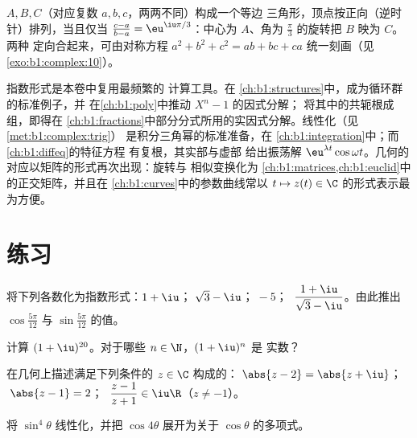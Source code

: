 \begin{example}\label{ex:b1:complex:equilateral}
$A, B, C$（对应复数 $a, b, c$，两两不同）构成一个等边
三角形，顶点按正向（逆时针）排列，当且仅当
$\frac{c - a}{b - a} = \eu^{\iu\pi/3}$：中心为
$A$、角为 $\frac\pi3$ 的旋转把 $B$ 映为 $C$。两种
定向合起来，可由对称方程 $a^2 + b^2 + c^2 = ab
+ bc + ca$ 统一刻画（见\cref{exo:b1:complex:10}）。
\end{example}

\begin{remark}[本章的应用]\label{rem:b1:complex:whereused}
指数形式是本卷中复用最频繁的
计算工具。在
\cref{ch:b1:structures}中，成为循环群的标准例子，并
在\cref{ch:b1:poly}中推动 $X^n - 1$ 的因式分解；
将其中的共轭根成组，即得在
\cref{ch:b1:fractions}中部分分式所用的实因式分解。线性化（见\cref{met:b1:complex:trig}）
是积分三角幂的标准准备，在
\cref{ch:b1:integration}中；而\cref{ch:b1:diffeq}的特征方程
有复根，其实部与虚部
给出振荡解 $\eu^{\lambda t}\cos\omega
t$。几何的对应以矩阵的形式再次出现：旋转与
相似变换化为
\cref{ch:b1:matrices,ch:b1:euclid}中的正交矩阵，并且在
\cref{ch:b1:curves}中的参数曲线常以 $t \mapsto z(t)
\in \C$ 的形式表示最为方便。
\end{remark}

\section{练习}

\begin{exercise}[$\star$]\label{exo:b1:complex:1}
将下列各数化为指数形式：$1 + \iu$；$\;\sqrt 3 - \iu$；$\;-5$；
$\;\dfrac{1 + \iu}{\sqrt 3 - \iu}$。由此推出
$\cos\frac{5\pi}{12}$ 与 $\sin\frac{5\pi}{12}$ 的值。
\end{exercise}

\begin{exercise}[$\star$]\label{exo:b1:complex:2}
计算 $(1 + \iu)^{20}$。对于哪些 $n \in \N$，$(1 + \iu)^n$ 是
实数？
\end{exercise}

\begin{exercise}[$\star$]\label{exo:b1:complex:3}
在几何上描述满足下列条件的 $z \in \C$ 构成的：
$\abs{z - 2} = \abs{z + \iu}$；$\;\abs{z - 1} = 2$；
$\;\dfrac{z - 1}{z + 1} \in \iu\R$（$z \neq -1$）。
\end{exercise}

\begin{exercise}[$\star$]\label{exo:b1:complex:4}
将 $\sin^4\theta$ 线性化，并把 $\cos 4\theta$ 展开为关于
$\cos\theta$ 的多项式。
\end{exercise}

